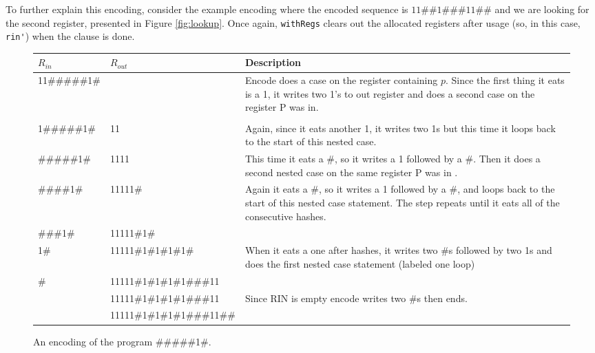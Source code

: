\documentclass[10pt, preprint, nocopyrightspace]{sigplanconf}
\newcommand{\figref}[1]{Figure \ref{#1}}
\begin{document}
To further explain this encoding, consider the example encoding where the
encoded sequence is $11\#\#1\#\#\#11\#\#$ and we are looking for the second
register, presented in \figref{fig:lookup}. Once again, \lstinline{withRegs}
clears out the allocated registers after usage (so, in this case,
\lstinline{rin'}) when the clause is done.

\begin{figure*}
\begin{tabular}{llp{}}
$R_{in}$ & $R_{out}$ & Description\\\hline
11\#\#\#\#\#1\# &  & 
Encode does a case on the register containing $p$.
Since the first thing it eats is a 1, it writes two 1’s to out register and does
a second case on the register  P was in.\\

\\  1\#\#\#\#\#1\# &
 11 &
Again,  since it eats another 1, it writes two 1s but this time it loops back to
the start of this nested case. 
\\ \#\#\#\#\#1\# &
 1111 &
This time it eats a \#, so it writes a 1 followed by a \#. Then it does a second
nested case on the same register P was in . 
\\ \#\#\#\#1\# &
 11111\# &
Again it eats a \#, so it writes a 1 followed by a \#, and loops back to the
start of this nested case statement. The step repeats until it eats all of the
consecutive hashes. 
\\ \#\#\#1\# &
11111\#1\# &
\\1\# &
  11111\#1\#1\#1\#1\# &
When it eats a one after hashes, it writes two \#s followed by two 1s and does
the first nested case statement (labeled one loop)
\\\# &
 11111\#1\#1\#1\#1\#\#\#11 &
\\  &
 11111\#1\#1\#1\#1\#\#\#11 &
Since RIN is empty encode writes two \#s then ends.  
\\ &
  11111\#1\#1\#1\#1\#\#\#11\#\# &
\\
\end{tabular}
\caption{\label{fig:encode-prog}An encoding of the program \#\#\#\#\#1\#.}
\end{figure*}
\end{document}
